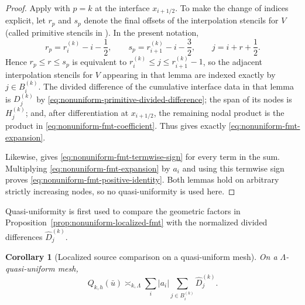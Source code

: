 \documentclass[11pt]{amsart}
\theoremstyle{plain}
\newtheorem{corollary}[theorem]{Corollary}
\theoremstyle{definition}
\theoremstyle{remark}
\numberwithin{equation}{section}
\theoremstyle{plain}
\begin{document}
\begin{proof}
	Apply \cite[Lemma~2.1]{FMT} with $p=k$ at the interface $x_{i+1/2}$.
	To make the change of indices explicit, let $r_p$ and $s_p$ denote the
	final offsets of the interpolation stencils for $V$ (called primitive
	stencils in \cite{FMT}).  In the present
	notation,
	\[
		r_p=r_i^{(k)}-i-\frac12,
		\qquad
		s_p=r_{i+1}^{(k)}-i-\frac32,
		\qquad
		j=i+r+\frac12.
	\]
	Hence $r_p\le r\le s_p$ is equivalent to
	$r_i^{(k)}\le j\le r_{i+1}^{(k)}-1$, so the adjacent interpolation stencils for $V$
	appearing in that lemma are indexed exactly by $j\in B_i^{(k)}$.  The
	divided difference of the cumulative interface data in that lemma is
	$D_j^{(k)}$ by \eqref{eq:nonuniform-primitive-divided-difference}; the span
	of its nodes is $H_j^{(k)}$; and, after differentiation at
	$x_{i+1/2}$, the remaining nodal product is the product in
	\eqref{eq:nonuniform-fmt-coefficient}.  Thus \cite[Lemma~2.1]{FMT} gives exactly
	\eqref{eq:nonuniform-fmt-expansion}.

	Likewise, \cite[Lemma~2.2]{FMT} gives \eqref{eq:nonuniform-fmt-termwise-sign} for every term in the sum.
	Multiplying \eqref{eq:nonuniform-fmt-expansion} by $a_i$ and using this
	termwise sign proves \eqref{eq:nonuniform-fmt-positive-identity}.  Both
	lemmas hold on arbitrary strictly increasing nodes, so no quasi-uniformity
	is used here.
\end{proof}


Quasi-uniformity is first used to compare the geometric factors in
Proposition~\ref{prop:nonuniform-localized-fmt} with the normalized divided
differences $\widehat D_j^{(k)}$.

\begin{corollary}[\texorpdfstring{Localized source comparison on a quasi-uniform mesh}{Localized source comparison on a quasi-uniform mesh}]
	\label{cor:nonuniform-interval-source}
	On a $\Lambda$-quasi-uniform mesh,
	\begin{equation}\label{eq:nonuniform-interval-source-comparison}
		Q_{k,h}(\bar u)
		\asymp_{k,\Lambda}
		\sum_i|a_i|
		\sum_{j\in B_i^{(k)}}\widehat D_j^{(k)}.
	\end{equation}
\end{corollary}
\end{document}
